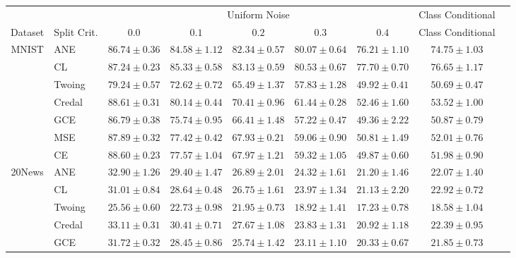 \documentclass[letterpaper]{article} %
\begin{document}
\begin{table}[t] 
	\scriptsize 
	\centering 
	\begin{tabular}{clccccccc} 
&& \multicolumn{5}{c}{Uniform Noise} & Class Conditional \\ \cline{3-8} 
Dataset & Split Crit. & $0.0$ & $0.1$ & $0.2$ & $0.3$ & $0.4$ & Class Conditional  \\ \hline 
\multirow{7}{*}{MNIST}
 & ANE    & $86.74 \pm 0.36$ & $\mathbf{84.58 \pm 1.12}$ & $\mathbf{82.34 \pm 0.57}$ & $\mathbf{80.07 \pm 0.64}$ & $76.21 \pm 1.10$ & $74.75 \pm 1.03$ \\ 
 & CL     & $87.24 \pm 0.23$ & $\mathbf{85.33 \pm 0.58}$ & $\mathbf{83.13 \pm 0.59}$ & $\mathbf{80.53 \pm 0.67}$ & $\mathbf{77.70 \pm 0.70}$ & $\mathbf{76.65 \pm 1.17}$ \\ 
 & Twoing & $79.24 \pm 0.57$ & $72.62 \pm 0.72$ & $65.49 \pm 1.37$ & $57.83 \pm 1.28$ & $49.92 \pm 0.41$ & $50.69 \pm 0.47$ \\ 
 & Credal & $\mathbf{88.61 \pm 0.31}$ & $80.14 \pm 0.44$ & $70.41 \pm 0.96$ & $61.44 \pm 0.28$ & $52.46 \pm 1.60$ & $53.52 \pm 1.00$ \\ 
 & GCE    & $86.79 \pm 0.38$ & $75.74 \pm 0.95$ & $66.41 \pm 1.48$ & $57.22 \pm 0.47$ & $49.36 \pm 2.22$ & $50.87 \pm 0.79$ \\ 
 & MSE    & $87.89 \pm 0.32$ & $77.42 \pm 0.42$ & $67.93 \pm 0.21$ & $59.06 \pm 0.90$ & $50.81 \pm 1.49$ & $52.01 \pm 0.76$ \\ 
 & CE     & $\mathbf{88.60 \pm 0.23}$ & $77.57 \pm 1.04$ & $67.97 \pm 1.21$ & $59.32 \pm 1.05$ & $49.87 \pm 0.60$ & $51.98 \pm 0.90$ \\ 
\hline
\multirow{7}{*}{20News}
 & ANE    & $\mathbf{32.90 \pm 1.26}$ & $\mathbf{29.40 \pm 1.47}$ & $\mathbf{26.89 \pm 2.01}$ & $\mathbf{24.32 \pm 1.61}$ & $\mathbf{21.20 \pm 1.46}$ & $\mathbf{22.07 \pm 1.40}$ \\ 
 & CL     & $31.01 \pm 0.84$ & $28.64 \pm 0.48$ & $\mathbf{26.75 \pm 1.61}$ & $\mathbf{23.97 \pm 1.34}$ & $\mathbf{21.13 \pm 2.20}$ & $\mathbf{22.92 \pm 0.72}$ \\ 
 & Twoing & $25.56 \pm 0.60$ & $22.73 \pm 0.98$ & $21.95 \pm 0.73$ & $18.92 \pm 1.41$ & $17.23 \pm 0.78$ & $18.58 \pm 1.04$ \\ 
 & Credal & $33.11 \pm 0.31$ & $\mathbf{30.41 \pm 0.71}$ & $\mathbf{27.67 \pm 1.08}$ & $\mathbf{23.83 \pm 1.31}$ & $\mathbf{20.92 \pm 1.18}$ & $\mathbf{22.39 \pm 0.95}$ \\ 
 & GCE    & $31.72 \pm 0.32$ & $28.45 \pm 0.86$ & $\mathbf{25.74 \pm 1.42}$ & $\mathbf{23.11 \pm 1.10}$ & $\mathbf{20.33 \pm 0.67}$ & $\mathbf{21.85 \pm 0.73}$ \\ 

\end{tabular}
\end{table}
\end{document}
